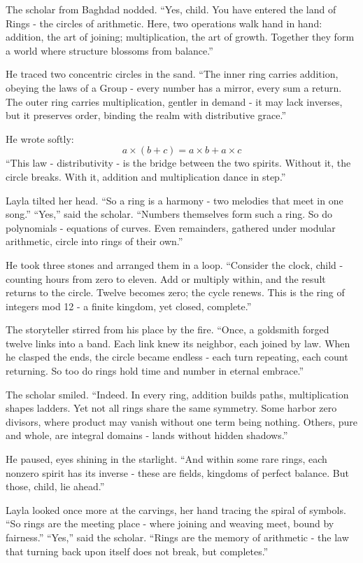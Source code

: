 \documentclass[
  letterpaper,
  DIV=11,
  numbers=noendperiod]{scrreprt}
\begin{document}
The scholar from Baghdad nodded. ``Yes, child. You have entered the land
of Rings - the circles of arithmetic. Here, two operations walk hand in
hand: addition, the art of joining; multiplication, the art of growth.
Together they form a world where structure blossoms from balance.''

He traced two concentric circles in the sand. ``The inner ring carries
addition, obeying the laws of a Group - every number has a mirror, every
sum a return. The outer ring carries multiplication, gentler in demand -
it may lack inverses, but it preserves order, binding the realm with
distributive grace.''

He wrote softly: \[
a \times (b + c) = a \times b + a \times c
\] ``This law - distributivity - is the bridge between the two spirits.
Without it, the circle breaks. With it, addition and multiplication
dance in step.''

Layla tilted her head. ``So a ring is a harmony - two melodies that meet
in one song.'' ``Yes,'' said the scholar. ``Numbers themselves form such
a ring. So do polynomials - equations of curves. Even remainders,
gathered under modular arithmetic, circle into rings of their own.''

He took three stones and arranged them in a loop. ``Consider the clock,
child - counting hours from zero to eleven. Add or multiply within, and
the result returns to the circle. Twelve becomes zero; the cycle renews.
This is the ring of integers mod 12 - a finite kingdom, yet closed,
complete.''

The storyteller stirred from his place by the fire. ``Once, a goldsmith
forged twelve links into a band. Each link knew its neighbor, each
joined by law. When he clasped the ends, the circle became endless -
each turn repeating, each count returning. So too do rings hold time and
number in eternal embrace.''

The scholar smiled. ``Indeed. In every ring, addition builds paths,
multiplication shapes ladders. Yet not all rings share the same
symmetry. Some harbor zero divisors, where product may vanish without
one term being nothing. Others, pure and whole, are integral domains -
lands without hidden shadows.''

He paused, eyes shining in the starlight. ``And within some rare rings,
each nonzero spirit has its inverse - these are fields, kingdoms of
perfect balance. But those, child, lie ahead.''

Layla looked once more at the carvings, her hand tracing the spiral of
symbols. ``So rings are the meeting place - where joining and weaving
meet, bound by fairness.'' ``Yes,'' said the scholar. ``Rings are the
memory of arithmetic - the law that turning back upon itself does not
break, but completes.''
\end{document}
